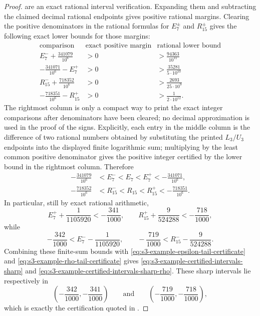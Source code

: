 \documentclass[11pt,a4paper]{amsart}
\theoremstyle{plain}
\theoremstyle{definition}
\theoremstyle{remark}
\begin{document}
\begin{proof}
  are an exact rational interval verification. Expanding them and
  subtracting the claimed decimal rational endpoints gives positive
  rational margins. Clearing the positive denominators in the rational
  formulas for \(E_7^\pm\) and \(R_{15}^\pm\) gives the following
  exact lower bounds for those margins:
  \[
  \begin{array}{c|c|c}
    \text{comparison} & \text{exact positive margin} & \text{rational lower bound} \\
    \hline
    E_7^-+\frac{341079}{10^6} & >0 & >\frac{94363}{10^{11}}\\
    -\frac{341071}{10^6}-E_7^+ & >0 & >\frac{35281}{5\cdot10^{10}}\\
    R_{15}^-+\frac{718352}{10^6} & >0 & >\frac{2693}{25\cdot10^{9}}\\
    -\frac{718351}{10^6}-R_{15}^+ & >0 & >\frac{1}{2\cdot10^{12}}.
  \end{array}
  \]
  The rightmost column is only a compact way to print the exact
  integer comparisons after denominators have been cleared; no decimal
  approximation is used in the proof of the signs.  Explicitly, each entry in
  the middle column is the difference of two rational numbers obtained by
  substituting the printed \(L_3/U_3\) endpoints into the displayed finite
  logarithmic sum; multiplying by the least common positive denominator gives
  the positive integer certified by the lower bound in the rightmost column.
  Therefore
  \begin{equation}\label{eq:s3-example-finite-sum-windows}
    \begin{aligned}
      -\frac{341079}{10^6}
      &<E_7^-<E_7<E_7^+<-\frac{341071}{10^6}, \\
      -\frac{718352}{10^6}
      &<R_{15}^-<R_{15}<R_{15}^+<-\frac{718351}{10^6}.
    \end{aligned}
  \end{equation}
  In particular, still by exact rational arithmetic,
  \[
    E_7^+ +\frac1{1105920}<-\frac{341}{1000},
    \qquad
    R_{15}^+ +\frac9{524288}<-\frac{718}{1000},
  \]
  while
  \[
    -\frac{342}{1000}<E_7^- -\frac1{1105920},
    \qquad
    -\frac{719}{1000}<R_{15}^- -\frac9{524288}.
  \]
  Combining these finite-sum bounds with
  \eqref{eq:s3-example-epsilon-tail-certificate} and
  \eqref{eq:s3-example-rho-tail-certificate} gives
  \eqref{eq:s3-example-certified-intervals-sharp} and
  \eqref{eq:s3-example-certified-intervals-sharp-rho}. These sharp
  intervals lie respectively in
  \[
    \left(-\frac{342}{1000},-\frac{341}{1000}\right)
    \qquad\text{and}\qquad
    \left(-\frac{719}{1000},-\frac{718}{1000}\right),
  \]
  which is exactly the certification quoted in
  .
\end{proof}
\end{document}
